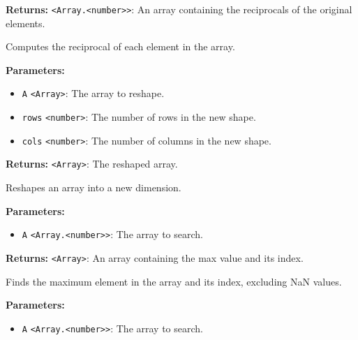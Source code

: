 \documentclass[12pt,a4paper]{article}
\begin{document}
\noindent \textbf{Returns:} \texttt{<Array.<number>>}: An array containing the reciprocals of the original elements.

\noindent Computes the reciprocal of each element in the array.

\vspace{5mm}
\noindent {}


\noindent \textbf{Parameters:}
\begin{itemize}
  \item \texttt{A} \texttt{<Array>}: The array to reshape.
  \item \texttt{rows} \texttt{<number>}: The number of rows in the new shape.
  \item \texttt{cols} \texttt{<number>}: The number of columns in the new shape.
\end{itemize}

\noindent \textbf{Returns:} \texttt{<Array>}: The reshaped array.

\noindent Reshapes an array into a new dimension.

\vspace{5mm}
\noindent {}


\noindent \textbf{Parameters:}
\begin{itemize}
  \item \texttt{A} \texttt{<Array.<number>>}: The array to search.
\end{itemize}

\noindent \textbf{Returns:} \texttt{<Array>}: An array containing the max value and its index.

\noindent Finds the maximum element in the array and its index, excluding NaN values.

\vspace{5mm}
\noindent {}


\noindent \textbf{Parameters:}
\begin{itemize}
  \item \texttt{A} \texttt{<Array.<number>>}: The array to search.
\end{itemize}
\end{document}
